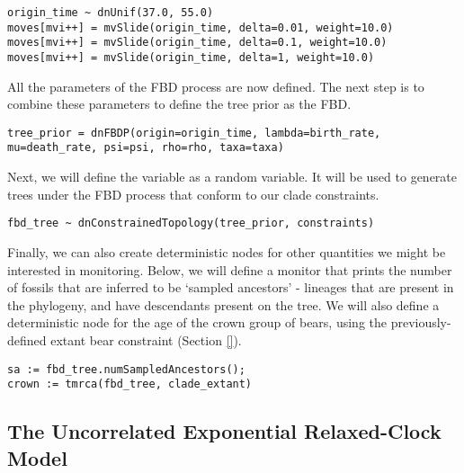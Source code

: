 {\tt \begin{snugshade*}
\begin{lstlisting}
origin_time ~ dnUnif(37.0, 55.0)
moves[mvi++] = mvSlide(origin_time, delta=0.01, weight=10.0)
moves[mvi++] = mvSlide(origin_time, delta=0.1, weight=10.0)
moves[mvi++] = mvSlide(origin_time, delta=1, weight=10.0)
\end{lstlisting}
\end{snugshade*}}

All the parameters of the FBD process are now defined. The next step is to combine these parameters to define the tree prior as the FBD.

{\tt \begin{snugshade*}
\begin{lstlisting}
tree_prior = dnFBDP(origin=origin_time, lambda=birth_rate, mu=death_rate, psi=psi, rho=rho, taxa=taxa)
\end{lstlisting}
\end{snugshade*}}

Next, we will define the  variable as a random variable. It will be used to generate trees under the FBD process that conform to our clade constraints. 

{\tt \begin{snugshade*}
\begin{lstlisting}
fbd_tree ~ dnConstrainedTopology(tree_prior, constraints) 
\end{lstlisting}
\end{snugshade*}}

Finally, we can also create deterministic nodes for other quantities we might be interested in monitoring. Below, we will define a monitor that prints the number of fossils that are inferred to be `sampled ancestors' - lineages that are present in the phylogeny, and have descendants present on the tree. We will also define a deterministic node for the age of the crown group of bears, using the previously-defined extant bear constraint (Section \ref{}).

{\tt \begin{snugshade*}
\begin{lstlisting}
sa := fbd_tree.numSampledAncestors();
crown := tmrca(fbd_tree, clade_extant)
\end{lstlisting}
\end{snugshade*}}

\bigskip

\subsection{The Uncorrelated Exponential Relaxed-Clock Model}\label{subsect:RB-ModelUCExp}

